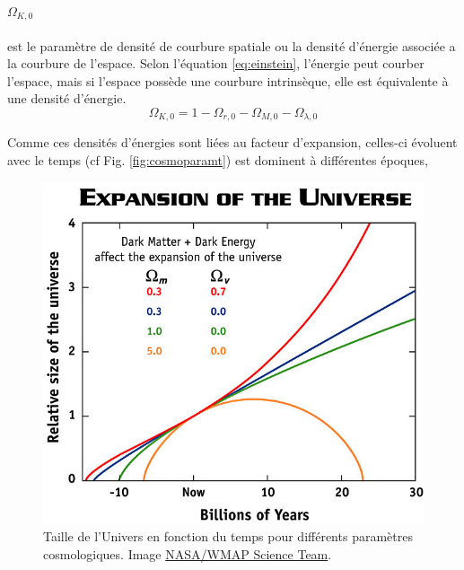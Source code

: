 \paragraph{$\Omega_{K,0}$} est le paramètre de densité de courbure spatiale ou la densité d'énergie associée a la courbure de l'espace.
Selon l’équation \ref{eq:einstein}, l'énergie peut courber l'espace, mais si l'espace possède une courbure intrinsèque, elle est équivalente à une densité d'énergie.
\begin{equation}
\Omega_{K,0} = 1 - \Omega_{r,0} - \Omega_{M,0} - \Omega_{\lambda,0} 
\end{equation}

Comme ces densités d'énergies sont liées au facteur d'expansion, celles-ci évoluent avec le temps (cf Fig. \ref{fig:cosmoparamt}) est dominent à différentes époques,

\begin{figure}
        \includegraphics[width=.9\linewidth]{img/01/scale_t.jpg} 
        \caption[Taille de l'Univers]{Taille de l'Univers en fonction du temps pour différents paramètres cosmologiques.
		Image \href{https://map.gsfc.nasa.gov/universe/bb_concepts_exp.html}{NASA/WMAP Science Team}.
 		\label{fig:scale_t}}
\end{figure}

